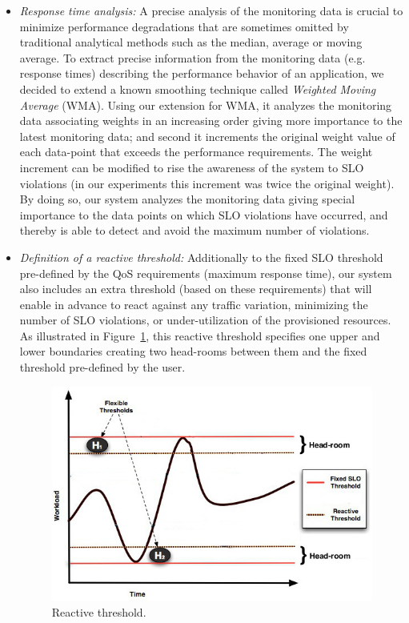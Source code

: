 \begin{itemize}

\item \emph{Response time analysis:} A precise analysis of the monitoring data is crucial to minimize performance degradations that are sometimes omitted by traditional analytical methods such as the median, average or moving average. To extract precise information from the monitoring data  (e.g. response times) describing the performance behavior of an application, we decided to extend a known smoothing technique called \emph{Weighted Moving Average} (WMA). Using our extension for WMA, it analyzes the monitoring data associating weights in an increasing order giving more importance to the latest monitoring data; and second it increments the original weight value of each data-point that exceeds the performance requirements. The weight increment can be modified to rise the awareness of the system to SLO violations  (in our experiments this increment was twice the original weight). By doing so, our system analyzes the monitoring data giving special importance to the data points on which SLO violations have occurred, and thereby is able to detect and avoid the maximum number of violations.

\item \emph{Definition of a reactive threshold:} Additionally to the fixed SLO threshold pre-defined by the QoS requirements (maximum response time), our system also includes an extra threshold (based on these requirements) that will enable in advance to react against any traffic variation, minimizing the number of SLO violations, or under-utilization of the provisioned resources. As illustrated in Figure~\ref{thr}, this reactive threshold specifies one upper and lower boundaries creating two head-rooms between them and the fixed threshold pre-defined by the user.

\begin{figure}[htb]
  \begin{center}
    \includegraphics[width=.85\linewidth]{images/thresholdGraphic}
  \end{center}
\vspace{-5mm}
  \caption{Reactive threshold.}
  \label{thr}
\end{figure}


\end{itemize}
